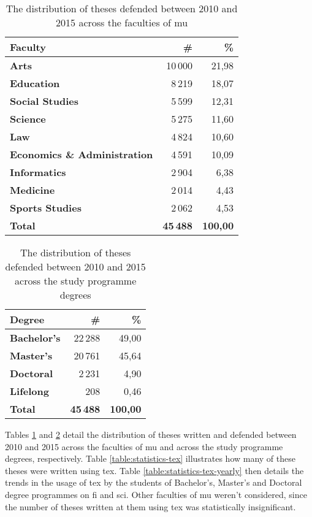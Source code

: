   \begin{table}
    \begin{tabularx}{\textwidth}{Xrr}
      \textbf{Faculty} & \textbf{\#} & \textbf{\%} \\
      \hline
      \textbf{Arts}                         & 10\,000 & 21,98 \\%
      \textbf{Education}                    & 8\,219  & 18,07 \\%
      \textbf{Social Studies}               & 5\,599  & 12,31 \\%
      \textbf{Science}                      & 5\,275  & 11,60 \\%
      \textbf{Law}                          & 4\,824  & 10,60 \\%
      \textbf{Economics \& Administration}  & 4\,591  & 10,09 \\%
      \textbf{Informatics}                  & 2\,904  &  6,38 \\%
      \textbf{Medicine}                     & 2\,014  &  4,43 \\%
      \textbf{Sports Studies}               & 2\,062  &  4,53 \\%
      \hline
      \textbf{Total}                        & \textbf{45\,488} & \textbf{100,00}
    \end{tabularx}
    \caption{The distribution of theses defended between 2010 and 2015 across the faculties of \gls{mu}}
    \label{table:statistics-faculty}
  \end{table}

  \begin{table}
    \begin{tabularx}{\textwidth}{Xrr}
      \textbf{Degree} & \textbf{\#} & \textbf{\%} \\
      \hline
      \textbf{Bachelor's} & 22\,288 & 49,00 \\
      \textbf{Master's}   & 20\,761 & 45,64 \\
      \textbf{Doctoral}   &  2\,231 &  4,90 \\
      \textbf{Lifelong}   &     208 &  0,46 \\
      \hline
      \textbf{Total}      & \textbf{45\,488} & \textbf{100,00}
    \end{tabularx}
    \caption{The distribution of theses defended between 2010 and 2015 across the study programme degrees}
    \label{table:statistics-degree}
  \end{table}
  
  Tables \ref{table:statistics-faculty} and \ref{table:statistics-degree} detail the distribution of theses written and defended between 2010 and 2015 across the faculties of \gls{mu} and across the study programme degrees, respectively. Table \ref{table:statistics-tex} illustrates how many of these theses were written using \gls{tex}. Table \ref{table:statistics-tex-yearly} then details the trends in the usage of \gls{tex} by the students of Bachelor's, Master's and Doctoral degree programmes on \gls{fi} and \gls{sci}. Other faculties of \gls{mu} weren't considered, since the number of theses written at them using \gls{tex} was statistically insignificant.

